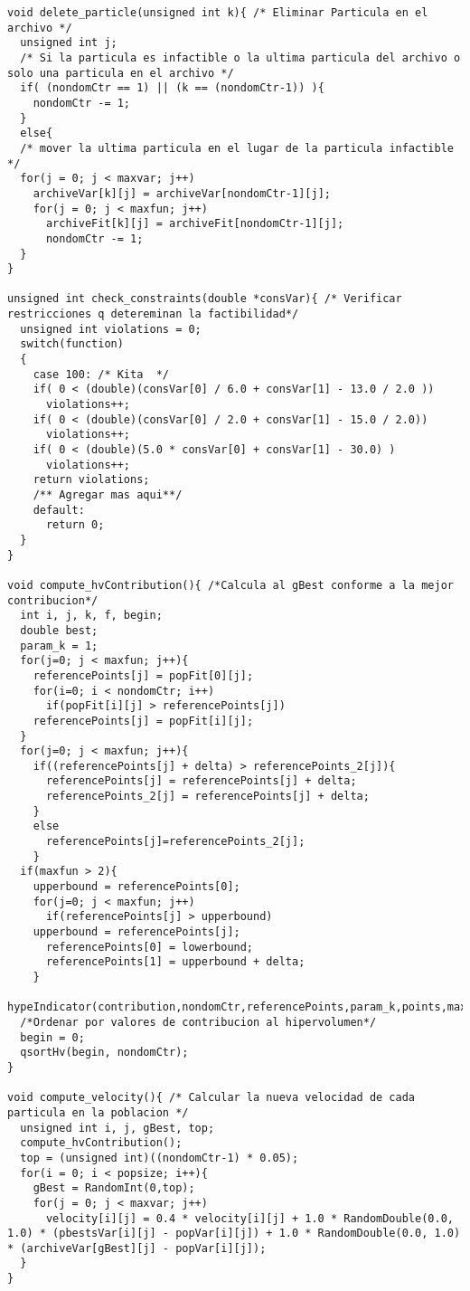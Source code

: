 \begin{lstlisting}[style=C]
void delete_particle(unsigned int k){ /* Eliminar Particula en el archivo */
  unsigned int j;
  /* Si la particula es infactible o la ultima particula del archivo o solo una particula en el archivo */
  if( (nondomCtr == 1) || (k == (nondomCtr-1)) ){
    nondomCtr -= 1;
  }
  else{
  /* mover la ultima particula en el lugar de la particula infactible */
  for(j = 0; j < maxvar; j++)
    archiveVar[k][j] = archiveVar[nondomCtr-1][j];
    for(j = 0; j < maxfun; j++)
      archiveFit[k][j] = archiveFit[nondomCtr-1][j];
      nondomCtr -= 1;
  }
}

unsigned int check_constraints(double *consVar){ /* Verificar restricciones q detereminan la factibilidad*/
  unsigned int violations = 0;
  switch(function)
  {
    case 100: /* Kita  */
    if( 0 < (double)(consVar[0] / 6.0 + consVar[1] - 13.0 / 2.0 ))
      violations++;
    if( 0 < (double)(consVar[0] / 2.0 + consVar[1] - 15.0 / 2.0))
      violations++;
    if( 0 < (double)(5.0 * consVar[0] + consVar[1] - 30.0) )
      violations++;
    return violations;
    /** Agregar mas aqui**/
    default:
      return 0;
  }
}

void compute_hvContribution(){ /*Calcula al gBest conforme a la mejor contribucion*/
  int i, j, k, f, begin;
  double best;
  param_k = 1;
  for(j=0; j < maxfun; j++){
    referencePoints[j] = popFit[0][j];
    for(i=0; i < nondomCtr; i++)
      if(popFit[i][j] > referencePoints[j])
	referencePoints[j] = popFit[i][j];    
  }
  for(j=0; j < maxfun; j++){
    if((referencePoints[j] + delta) > referencePoints_2[j]){
      referencePoints[j] = referencePoints[j] + delta;
      referencePoints_2[j] = referencePoints[j] + delta;
    }
    else
      referencePoints[j]=referencePoints_2[j];        
    }
  if(maxfun > 2){
    upperbound = referencePoints[0];
    for(j=0; j < maxfun; j++)
      if(referencePoints[j] > upperbound)
	upperbound = referencePoints[j];
      referencePoints[0] = lowerbound;
      referencePoints[1] = upperbound + delta;      
    }
  hypeIndicator(contribution,nondomCtr,referencePoints,param_k,points,maxfun);
  /*Ordenar por valores de contribucion al hipervolumen*/
  begin = 0;
  qsortHv(begin, nondomCtr);
}

void compute_velocity(){ /* Calcular la nueva velocidad de cada particula en la poblacion */
  unsigned int i, j, gBest, top;
  compute_hvContribution();
  top = (unsigned int)((nondomCtr-1) * 0.05);
  for(i = 0; i < popsize; i++){
    gBest = RandomInt(0,top);
    for(j = 0; j < maxvar; j++)
      velocity[i][j] = 0.4 * velocity[i][j] + 1.0 * RandomDouble(0.0, 1.0) * (pbestsVar[i][j] - popVar[i][j]) + 1.0 * RandomDouble(0.0, 1.0) * (archiveVar[gBest][j] - popVar[i][j]);
  }
}


\end{lstlisting}
